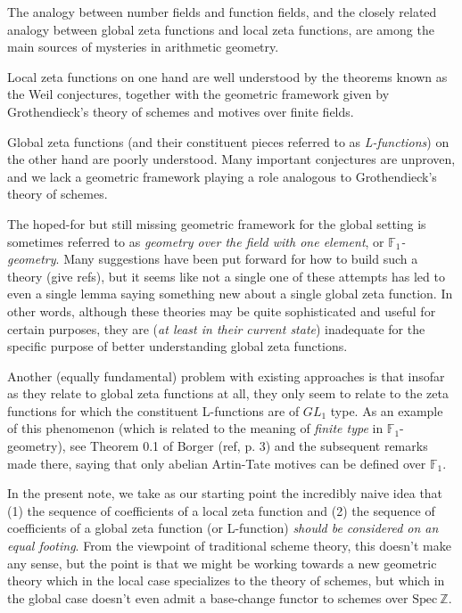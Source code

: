 \documentclass[paper=a4, fontsize=11pt]{scrartcl} %
\numberwithin{equation}{section} %
\numberwithin{figure}{section} %
\numberwithin{table}{section} %
\begin{document}
The analogy between number fields and function fields, and the closely related analogy between global zeta functions and local zeta functions, are among the main sources of mysteries in arithmetic geometry.

Local zeta functions on one hand are well understood by the theorems known as the Weil conjectures, together with the geometric framework given by Grothendieck's theory of schemes and motives over finite fields.

Global zeta functions (and their constituent pieces referred to as \emph{L-functions}) on the other hand are poorly understood. Many important conjectures are unproven, and we lack a geometric framework playing a role analogous to Grothendieck's theory of schemes.

The hoped-for but still missing geometric framework for the global setting is sometimes referred to as \emph{geometry over the field with one element}, or \emph{$\mathbb{F}_1$-geometry}. Many suggestions have been put forward for how to build such a theory (give refs), but it seems like not a single one of these attempts has led to even a single lemma saying something new about a single global zeta function. In other words, although these theories may be quite sophisticated and useful for certain purposes, they are (\emph{at least in their current state}) inadequate for the specific purpose of better understanding global zeta functions.

Another (equally fundamental) problem with existing approaches is that insofar as they relate to global zeta functions at all, they only seem to relate to the zeta functions for which the constituent L-functions are of $GL_1$ type. As an example of this phenomenon (which is related to the meaning of \emph{finite type} in $\mathbb{F}_1$-geometry), see Theorem 0.1 of Borger (ref, p. 3) and the subsequent remarks made there, saying that only abelian Artin-Tate motives can be defined over $\mathbb{F}_1$. %

In the present note, we take as our starting point the incredibly naive idea that (1) the sequence of coefficients of a local zeta function and (2) the sequence of coefficients of a global zeta function (or L-function) \emph{should be considered on an equal footing}. From the viewpoint of traditional scheme theory, this doesn't make any sense, but the point is that we might be working towards a new geometric theory which in the local case specializes to the theory of schemes, but which in the global case doesn't even admit a base-change functor to schemes over $\mathrm{Spec} \ \mathbb{Z}$.
\end{document}
